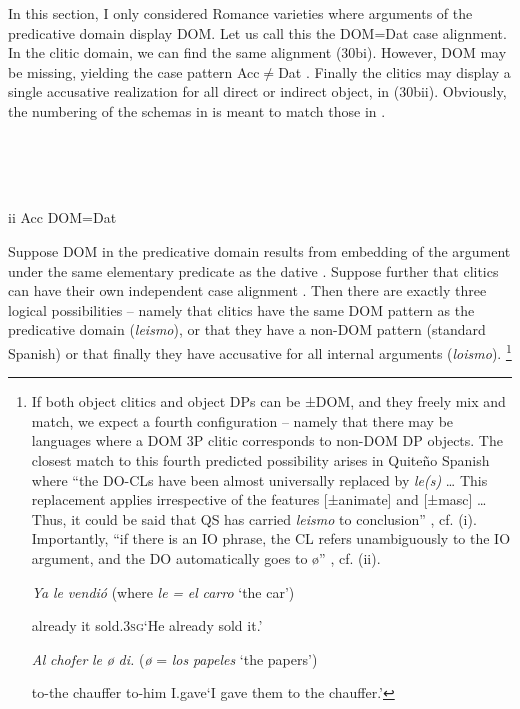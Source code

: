 \documentclass[output=paper]{langscibook}
\begin{document}
In this section, I only considered Romance varieties where arguments of the predicative domain display DOM. Let us call this the DOM=Dat case alignment. In the clitic domain, we can find the same alignment (30bi). However, DOM may be missing, yielding the case pattern Acc${\neq}$Dat . Finally the clitics may display a single accusative realization for all direct or indirect object, in (30bii). Obviously, the numbering of the schemas in  is meant to match those in .

\ea\label{ex:key:}
{} \\
\z

\ea\label{ex:key:}
\\
\ea\label{ex:key:}
 \\
ii  Acc        DOM=Dat 
\z 
\z 

Suppose DOM in the predicative domain results from embedding of the argument under the same elementary predicate as the dative . Suppose further that clitics can have their own independent case alignment . Then there are exactly three logical possibilities – namely that clitics have the same DOM pattern as the predicative domain (\textit{leismo}), or that they have a non-DOM pattern (standard Spanish) or that finally they have accusative for all internal arguments (\textit{loismo}).{} \footnote{If both object clitics and object DPs can be ±DOM, and they freely mix and match, we expect a fourth configuration – namely that there may be languages where a DOM 3P clitic corresponds to non-DOM DP objects. The closest match to this fourth predicted possibility arises in Quiteño Spanish where “the DO-CLs have been almost universally replaced by \textit{le(s)} … This replacement applies irrespective of the features [±animate] and [±masc] …Thus, it could be said that QS has carried \textit{leismo} to conclusion” \citep[387-388]{Suñer1989}, cf. (i). Importantly, “if there is an IO phrase, the CL refers unambiguously to the IO argument, and the DO automatically goes to ø” \citep[389]{Suñer1989}, cf. (ii).  

\ea
\textit{Ya} \textit{le}   \textit{vendió}      (where \textit{le} \textit{=} \textit{el} \textit{carro} ‘the car’)

\z

\ea
already   it   sold\textsc{.3sg}‘He already sold it.’
 
\textit{Al} \textit{chofer}     \textit{le}   \textit{ø} \textit{di.}   (\textit{ø} = \textit{los} \textit{papeles} ‘the papers’)

\z
to-the chauffer   to-him   I.gave‘I gave them to the chauffer.’}
\end{document}
